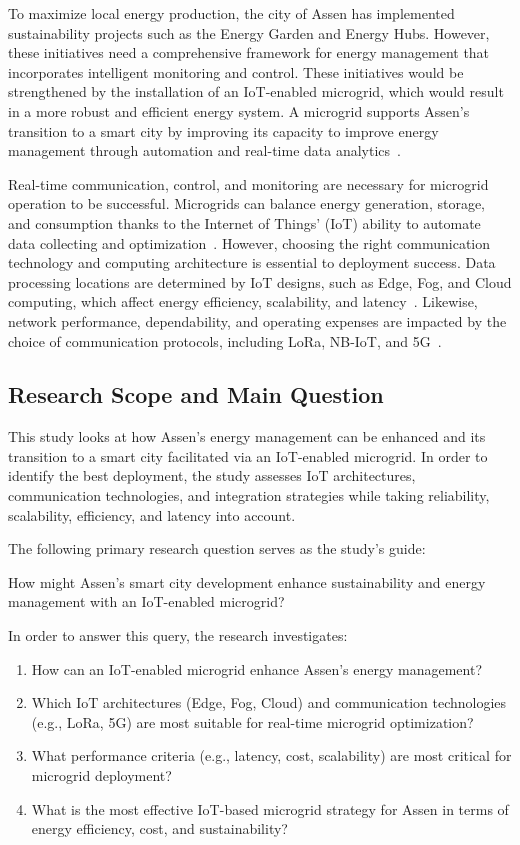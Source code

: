 \documentclass[conference]{IEEEtran}
\begin{document}
To maximize local energy production, the city of Assen has implemented sustainability projects such as the Energy Garden and Energy Hubs. However, these initiatives need a comprehensive framework for energy management that incorporates intelligent monitoring and control. These initiatives would be strengthened by the installation of an IoT-enabled microgrid, which would result in a more robust and efficient energy system. A microgrid supports Assen's transition to a smart city by improving its capacity to improve energy management through automation and real-time data analytics~\cite{smartcities4020024}.

Real-time communication, control, and monitoring are necessary for microgrid operation to be successful. Microgrids can balance energy generation, storage, and consumption thanks to the Internet of Things' (IoT) ability to automate data collecting and optimization~\cite{9823928}. However, choosing the right communication technology and computing architecture is essential to deployment success. Data processing locations are determined by IoT designs, such as Edge, Fog, and Cloud computing, which affect energy efficiency, scalability, and latency~\cite{CloudFogMist2021}. Likewise, network performance, dependability, and operating expenses are impacted by the choice of communication protocols, including LoRa, NB-IoT, and 5G~\cite{9823928}.

\subsection{Research Scope and Main Question}

This study looks at how Assen's energy management can be enhanced and its transition to a smart city facilitated via an IoT-enabled microgrid. In order to identify the best deployment, the study assesses IoT architectures, communication technologies, and integration strategies while taking reliability, scalability, efficiency, and latency into account.

The following primary research question serves as the study's guide: 

How might Assen's smart city development enhance sustainability and energy management with an IoT-enabled microgrid?

In order to answer this query, the research investigates:

\begin{enumerate}
    \item How can an IoT-enabled microgrid enhance Assen’s energy management?
    \item Which IoT architectures (Edge, Fog, Cloud) and communication technologies (e.g., LoRa, 5G) are most suitable for real-time microgrid optimization?
    \item What performance criteria (e.g., latency, cost, scalability) are most critical for microgrid deployment?
    \item What is the most effective IoT-based microgrid strategy for Assen in terms of energy efficiency, cost, and sustainability?
\end{enumerate}
\end{document}
